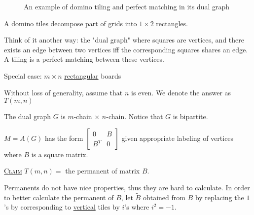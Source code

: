 \documentclass{report}
\newcommand{\fancyem}[1]{\underline{\textsc{#1}}}
\theoremstyle{definition}
\theoremstyle{remark}
\numberwithin{equation}{section}
\begin{document}
\begin{figure}[h]
\label{fig:domino}
\caption{An example of domino tiling and perfect matching in its dual graph}
\end{figure}

A domino tiles decompose part of grids into $1 \times 2$ rectangles.

Think of it another way: the "dual graph" where squares are vertices, and there exists an edge between two vertices iff the corresponding squares shares an edge. A tiling is a perfect matching between these vertices. 

Special case: $m \times n$ \underline{rectangular} boards
\begin{figure}[h]
\centering
{}
\end{figure}

Without loss of generality, assume  that $n$ is even. We denote the answer as $T(m, n)$

The dual graph $G$ is $m$-chain $\times$ $n$-chain. Notice that $G$ is bipartite.

$M = A(G)$ has the form $\begin{bmatrix}
0 & B \\ B^T & 0
\end{bmatrix}$ given appropriate labeling of vertices where $B$ is a square matrix.

\fancyem{Claim} $T(m, n) =$ the permanent of matrix $B.$

Permanents do not have nice properties, thus they are hard to calculate. In order to better calculate the permanent of $B$, let $\tilde{B}$ obtained from $B$ by replacing the $1$'s by corresponding to \underline{vertical} tiles by $i$'s where $i^2 = -1.$
\end{document}
